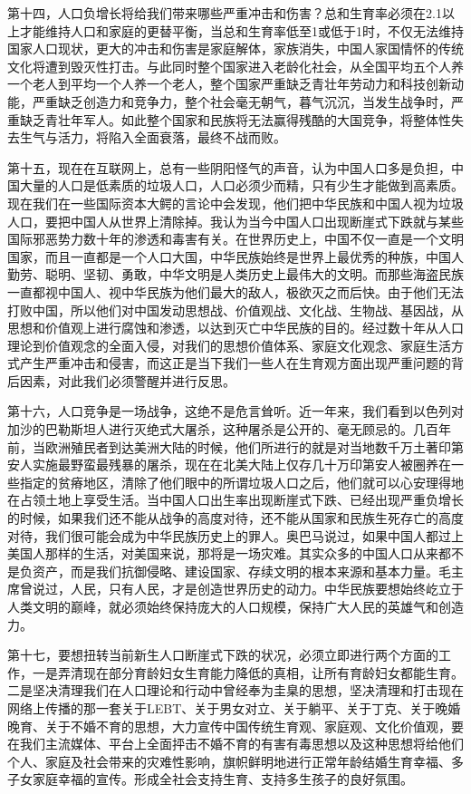 \documentclass[UTF8,11pt,oneside]{ctexart}
\begin{document}
第十四，人口负增长将给我们带来哪些严重冲击和伤害？总和生育率必须在2.1以上才能维持人口和家庭的更替平衡，当总和生育率低至1或低于1时，不仅无法维持国家人口现状，更大的冲击和伤害是家庭解体，家族消失，中国人家国情怀的传统文化将遭到毁灭性打击。与此同时整个国家进入老龄化社会，从全国平均五个人养一个老人到平均一个人养一个老人，整个国家严重缺乏青壮年劳动力和科技创新动能，严重缺乏创造力和竞争力，整个社会毫无朝气，暮气沉沉，当发生战争时，严重缺乏青壮年军人。如此整个国家和民族将无法赢得残酷的大国竞争，将整体性失去生气与活力，将陷入全面衰落，最终不战而败。

第十五，现在在互联网上，总有一些阴阳怪气的声音，认为中国人口多是负担，中国大量的人口是低素质的垃圾人口，人口必须少而精，只有少生才能做到高素质。现在我们在一些国际资本大鳄的言论中会发现，他们把中华民族和中国人视为垃圾人口，要把中国人从世界上清除掉。我认为当今中国人口出现断崖式下跌就与某些国际邪恶势力数十年的渗透和毒害有关。在世界历史上，中国不仅一直是一个文明国家，而且一直都是一个人口大国，中华民族始终是世界上最优秀的种族，中国人勤劳、聪明、坚韧、勇敢，中华文明是人类历史上最伟大的文明。而那些海盗民族一直都视中国人、视中华民族为他们最大的敌人，极欲灭之而后快。由于他们无法打败中国，所以他们对中国发动思想战、价值观战、文化战、生物战、基因战，从思想和价值观上进行腐蚀和渗透，以达到灭亡中华民族的目的。经过数十年从人口理论到价值观念的全面入侵，对我们的思想价值体系、家庭文化观念、家庭生活方式产生严重冲击和侵害，而这正是当下我们一些人在生育观方面出现严重问题的背后因素，对此我们必须警醒并进行反思。

第十六，人口竞争是一场战争，这绝不是危言耸听。近一年来，我们看到以色列对加沙的巴勒斯坦人进行灭绝式大屠杀，这种屠杀是公开的、毫无顾忌的。几百年前，当欧洲殖民者到达美洲大陆的时候，他们所进行的就是对当地数千万土著印第安人实施最野蛮最残暴的屠杀，现在在北美大陆上仅存几十万印第安人被圈养在一些指定的贫瘠地区，清除了他们眼中的所谓垃圾人口之后，他们就可以心安理得地在占领土地上享受生活。当中国人口出生率出现断崖式下跌、已经出现严重负增长的时候，如果我们还不能从战争的高度对待，还不能从国家和民族生死存亡的高度对待，我们很可能会成为中华民族历史上的罪人。奥巴马说过，如果中国人都过上美国人那样的生活，对美国来说，那将是一场灾难。其实众多的中国人口从来都不是负资产，而是我们抗御侵略、建设国家、存续文明的根本来源和基本力量。毛主席曾说过，人民，只有人民，才是创造世界历史的动力。中华民族要想始终屹立于人类文明的巅峰，就必须始终保持庞大的人口规模，保持广大人民的英雄气和创造力。

第十七，要想扭转当前新生人口断崖式下跌的状况，必须立即进行两个方面的工作，一是弄清现在部分育龄妇女生育能力降低的真相，让所有育龄妇女都能生育。二是坚决清理我们在人口理论和行动中曾经奉为圭臬的思想，坚决清理和打击现在网络上传播的那一套关于LEBT、关于男女对立、关于躺平、关于丁克、关于晚婚晚育、关于不婚不育的思想，大力宣传中国传统生育观、家庭观、文化价值观，要在我们主流媒体、平台上全面抨击不婚不育的有害有毒思想以及这种思想将给他们个人、家庭及社会带来的灾难性影响，旗帜鲜明地进行正常年龄结婚生育幸福、多子女家庭幸福的宣传。形成全社会支持生育、支持多生孩子的良好氛围。
\end{document}

